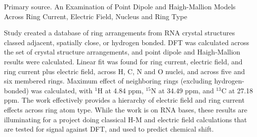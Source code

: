 \documentclass[11pt,a4paper]{article}
\begin{document}
Primary source. An Examination of Point Dipole and Haigh-Mallion Models Across Ring Current, Electric Field, Nucleus and Ring Type

Study created a database of ring arrangements from RNA crystal structures classed adjacent, spatially close, or hydrogen bonded. DFT was calculated across the set of crystal structure arrangements, and point dipole and Haigh-Mallion results were calculated. Linear fit was found for ring current, electric field, and ring current plus electric field, across H, C, N and O nuclei, and across five and six membered rings. Maximum effect of neighboring rings (excluding hydrogen-bonded) was calculated, with $^{1}$H at 4.84 ppm, $^{15}$N at 34.49 ppm, and $^{13}$C at 27.18 ppm. The work effectively provides a hierarchy of electric field and ring current effects across ring atom type. While the work is on RNA bases, these results are illuminating for a project doing classical H-M and electric field calculations that are tested for signal against DFT, and used to predict chemical shift.
\end{document}
